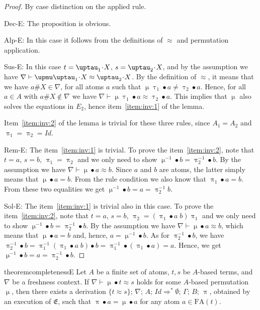 \documentclass[11pt,a4paper]{amsart}
\theoremstyle{definition}
\newcommand{\Lra}{\Longrightarrow}
\newcommand{\idp}{\mathit{Id}}
\newcommand{\perm}{\approx}
\newcommand{\permap}{{\mkern 1mu\cdot \mkern 1mu}}
\newcommand{\permef}{\bullet}
\newcommand\ppi{\uppi}
\newcommand\ptau{\uptau}
\newcommand\pmu{\upmu}
\newcommand{\msys}{\mathfrak{E}}
\newcommand{\mproblem}{E}
\newcommand{\Atoms}{A}
\newcommand{\nablai}{{\nabla}}
\newcommand{\nablag}{\Gamma}
\newcommand{\fatom}{\mathrm{FA}}
\begin{document}
\begin{proof} 
  By case distinction on the applied rule.

  {\sf Dec-E}: The proposition is obvious.

  {\sf Alp-E}: In this case it follows from the definitions of
  $\approx$ and permutation application.

  {\sf Sus-E}: In this case $t=\ptau_1\permap X$, $s=\ptau_2\permap
  X$, and by the assumption we have $\nabla \vdash \pmu \ptau_1\permap
  X \approx \ptau_2\permap X $. By the definition of $\approx$, it
  means that we have $a\#X\in\nabla$, for all atoms $a$ such that
  $\pmu \ptau_1 \permef a \neq \ptau_2 \permef a$. Hence, for all
  $a\in\Atoms$ with $a\#X\notin\nabla$ we have $\nabla \vdash \pmu
  \ptau_1 \permef a \approx \ptau_2 \permef a$. This implies that
  $\pmu$ also solves the equations in $\mproblem_2$, hence
  item~\ref{item:inv:1} of the lemma.

  Item~\ref{item:inv:2} of the lemma is trivial for these three
  rules, since $A_1=A_2$ and $\ppi_1=\ppi_2=\idp$.

  {\sf Rem-E}: The item~\ref{item:inv:1} is trivial. To prove the
  item~\ref{item:inv:2}, note that $t=a$, $s= b$, $\ppi_1=\ppi_2$ and
  we only need to show $\pmu^{-1}\permef b = \ppi_2^{-1} \permef
  b$. By the assumption we have $\nabla \vdash \pmu \permef a
  \approx b $. Since $a$ and $b$ are atoms, the latter simply means
  that $\pmu\permef a = b$. From the rule condition we also know that
  $\ppi_1\permef a = b$. From these two equalities we get $\pmu^{-1}
  \permef b = a = \ppi_2^{-1} b$.

  {\sf Sol-E}: The item~\ref{item:inv:1} is trivial also in this case.
  To prove the item~\ref{item:inv:2}, note that $t=a$, $s= b$,
  $\ppi_2=(\ppi_1\permef a\; b) \ppi_1$ and we only need to show
  $\pmu^{-1}\permef b = \ppi_2^{-1} \permef b$. By the assumption we
  have $\nabla \vdash \pmu \permef a \approx b $, which means that
  $\pmu \permef a = b$ and, hence, $a = \pmu^{-1}\permef b$. As for
  $\ppi_2^{-1}\permef b$, we have $\ppi_2^{-1} \permef b =
  \ppi_1^{-1}(\ppi_1\permef a\;b) \permef b =
  \ppi_1^{-1} \permef (\ppi_1\permef a) = a$. Hence, we get $\pmu^{-1}\permef b = a = \ppi_2^{-1}\permef b$.
\end{proof}



\begin{restatable}[Completeness of $\msys$]{theorem}{completenessE}
\label{thm:completeness:equiv}
   Let $\Atoms$ be a finite set of atoms, $t,s$ be $\Atoms$-based
   terms, and $\nabla$ be a freshness context. If
   $\nablai\vdash \pmu \permef t\approx s$ holds for some
   $\Atoms$-based permutation $\pmu$, then there exists a derivation $
   \{t\perm s\} ;\,\allowbreak \nablai ;\,\allowbreak
   \Atoms;\,\allowbreak \idp \Lra^* \emptyset ;\, \nablag;\, B ;\,
   \ppi $, obtained by an execution of $\msys$, such that $\ppi\permef
   a = \pmu\permef a$ for any atom $a\in\fatom(t)$.
\end{restatable}
\end{document}
